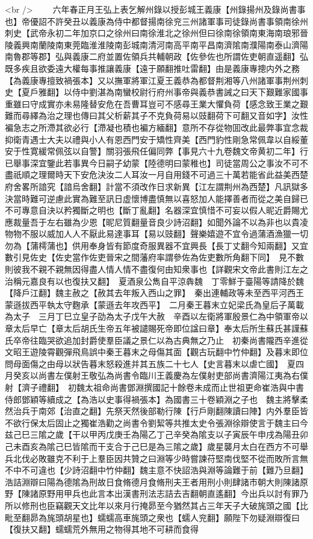 <br />
　　六年春正月王弘上表乞解州錄以授彭城王義康【州錄揚州及錄尚書事也】帝優詔不許癸丑以義康為侍中都督揚南徐兖三州諸軍事司徒錄尚書事領南徐州刺史【武帝永初二年加京口之徐州曰南徐淮北之徐州但曰徐南徐領南東海南琅邪晉陵義興南蘭陵南東莞臨淮淮陵南彭城南清河南高平南平昌南濟隂南濮陽南泰山濟陽南魯郡等郡】弘與義康二府並置佐領兵共輔朝政【佐參佐也所謂佐吏朝直遥翻】弘既多疾且欲委遠大權每事推讓義康【遠于願翻推吐雷翻】由是義康專摠内外之務【為義康專擅致禍張本】又以撫軍將軍江夏王義恭為都督荆湘等八州諸軍事荆州刺史【夏戶雅翻】以侍中劉湛為南蠻校尉行府州事帝與義恭書誡之曰天下艱難家國事重雖曰守成實亦未易隆替安危在吾曹耳豈可不感尋王業大懼負荷【感念致王業之艱難而尋繹為治之理也傳曰其父析薪其子不克負荷易以豉翻荷下可翻又音如字】汝性褊急志之所滯其欲必行【滯凝也積也褊方緬翻】意所不存從物囬改此最弊事宜念裁抑衛青遇士大夫以禮與小人有恩西門安于矯性齊美【西門豹性剛急常佩韋以自綏董安于性寛緩常佩弦以自警】關羽張飛任偏同弊【事見六十九卷魏文帝黄初二年】行已舉事深宜鑒此若事異今日嗣子幼蒙【陸德明曰蒙稚也】司徒當周公之事汝不可不盡祇順之理爾時天下安危決汝二人耳汝一月自用錢不可過三十萬若能省此益美西楚府舍畧所諳究【諳烏舍翻】計當不須改作日求新異【江左謂荆州為西楚】凡訊獄多決當時難可逆慮此實為難至訊日虚懷博盡慎無以喜怒加人能擇善者而從之美自歸已不可專意自決以矜獨斷之明也【斷丁亂翻】名器深宜慎惜不可妄以假人昵近爵賜尤應裁量吾于左右雖為少恩【昵尼質翻量音良少詩沼翻】如聞外論不以為非也以貴凌物物不服以威加人人不厭此易達事耳【易以豉翻】聲樂嬉遊不宜令過蒲酒漁獵一切勿為【蒲樗蒲也】供用奉身皆有節度奇服異器不宜興長【長丁丈翻今知兩翻】又宜數引見佐史【佐史當作佐吏晉宋之間藩府率謂參佐為佐吏數所角翻下同】　見不數則彼我不親不親無因得盡人情人情不盡復何由知衆事也【詳觀宋文帝此書則江左之治稱元嘉良有以也復扶又翻】　夏酒泉公雋自平涼犇魏　丁零鮮于臺陽等請降於魏【降戶江翻】魏主赦之【赦其去年叛入西山之罪】　秦出連輔政等未至西平河西王蒙遜拔西平執太守麴承【蒙遜去年攻西平】　二月秦王暮末立妃梁氏為皇后子萬載為太子　三月丁巳立皇子劭為太子戊午大赦　辛酉以左衛將軍殷景仁為中領軍帝以章太后早亡【章太后胡氏生帝五年被譴賜死帝即位諡曰章】奉太后所生蘇氏甚謹蘇氏卒帝往臨哭欲追加封爵使羣臣議之景仁以為古典無之乃止　初秦尚書隴西辛進從文昭王遊陵霄觀彈飛鳥誤中秦王暮末之母傷其面【觀古玩翻中竹仲翻】及暮末即位問母面傷之由母以狀告暮末怒殺進并其五族二十七人【史言暮末以虐亡國】　夏四月癸亥以尚書左僕射王敬弘為尚書令臨川王義慶為左僕射吏部尚書濟陽江夷為右僕射【濟子禮翻】　初魏太祖命尚書鄧淵撰國記十餘卷未成而止世祖更命崔浩與中書侍郎鄧穎等續成之【為浩以史事得禍張本】為國書三十卷穎淵之子也　魏主將擊柔然治兵于南郊【治直之翻】先祭天然後部勒行陳【行戶剛翻陳讀曰陣】内外羣臣皆不欲行保太后固止之獨崔浩勸之尚書令劉絜等共推太史令張淵徐辯使言于魏主曰今兹己巳三隂之歲【干以甲丙戊庚壬為陽乙丁己辛癸為隂支以子寅辰午申戌為陽丑卯己未酉亥為隂己巳皆隂而干支合于己巳是為三隂之歲】歲星襲月太白在西方不可舉兵北伐必敗雖克不利于上羣臣因共贊之曰淵等少時嘗諫苻堅南伐堅不從而敗所言無不中不可違也【少詩沼翻中竹仲翻】魏主意不快詔浩與淵等論難于前【難乃旦翻】浩詰淵辯曰陽為德隂為刑故日食脩德月食脩刑夫王者用刑小則肆諸市朝大則陳諸原野【陳諸原野用甲兵也此言本出漢書刑法志詰去吉翻朝直遙翻】今出兵以討有罪乃所以修刑也臣竊觀天文比年以來月行掩昴至今猶然其占三年天子大破旄頭之國【比毗至翻昴為旄頭胡星也】蠕蠕高車旄頭之衆也【蠕人兖翻】願陛下勿疑淵辯復曰【復扶又翻】蠕蠕荒外無用之物得其地不可耕而食得